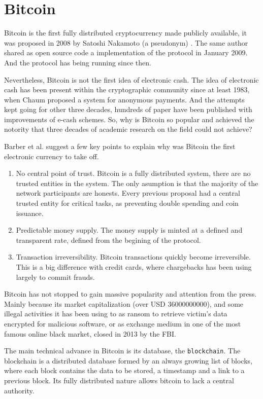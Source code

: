 \section{Bitcoin}
Bitcoin is the first fully distributed cryptocurrency made publicly available,
  it was proposed in 2008 by Satoshi Nakamoto (a pseudonym)
  \cite{nakamoto2008bitcoin}.
The same author shared as open source code a implementation of the protocol in
  January 2009. And the protocol has being running since then.

Nevertheless, Bitcoin is not the first idea of electronic cash.
The idea of electronic cash has been present within the cryptographic community
  since at least 1983, when Chaum \cite{chaum1983blind} proposed a system for
  anonymous payments.
And the attempts kept going for other three decades, hundreds of paper have
  been published with improvements of e-cash schemes\cite{barber2012bitter}.
So, why is Bitcoin so popular and achieved the notority that three decades of
  academic research on the field could not achieve?

Barber et al.\cite{barber2012bitter} suggest a few key points to explain why
  was Bitcoin the first electronic currency to take off.
\begin{enumerate}
\item No central point of trust.
	Bitcoin is a fully distributed system, there are no trusted entities in the
	  system. The only asumption is that the majority of the network participants
	  are honests. Every previous proposal had a central trusted entity for
	  critical tasks, as preventing double spending and coin issuance.
\item Predictable money supply.
	The money supply is minted at a defined and transparent rate, defined from the
	begining of the protocol.
\item Transaction irreversibility.
	Bitcoin transactions quickly become irreversible. This is a big difference with
	  credit cards, where chargebacks has been using largely to commit frauds.
\end{enumerate}
Bitcoin has not stopped to gain massive popularity and attention from the press.
Mainly because its market capitalization (over USD $36000000000$), and some
  illegal activities it has been using to as ransom to retrieve victim's data
  encrypted for malicious software, or as exchange medium in one of the most
  famous online black market, closed in 2013 by the FBI.

  The main technical advance in Bitcoin is its database, the
  \texttt{blockchain}\cite{inventionblockchain}\cite{blockchainmostimportant}.
The blockchain is a distributed database formed by an always growing list of
  blocks, where each block contains the data to be stored, a timestamp and a
  link to a previous block. Its fully distributed nature allows bitcoin to lack
  a central authority.

